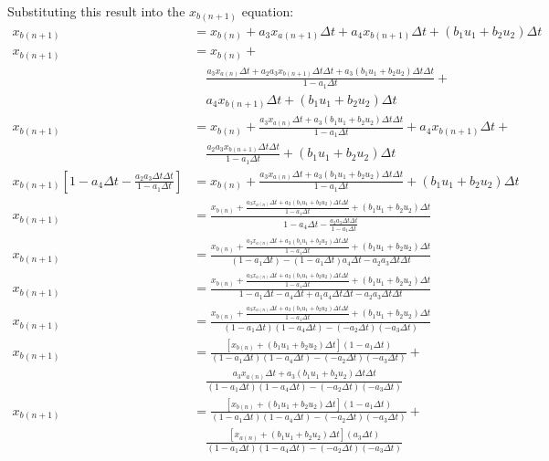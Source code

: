 \documentclass[11pt]{article}
\begin{document}
Substituting this result into the $x_{b(n+1)}$ equation:
\begin{subequations}
  \begin{align}
    x_{b(n+1)} &= x_{b(n)} +  a_3 x_{a(n+1)}\Delta t + a_4 x_{b(n+1)}\Delta t + (b_1 u_1 + b_2 u_2)\Delta t \\
    x_{b(n+1)} &= x_{b(n)} + \\ \nonumber
    &\quad \frac{a_3 x_{a(n)}\Delta t + a_2 a_3 x_{b(n+1)}\Delta t\Delta t + a_3(b_1 u_1 + b_2 u_2)\Delta t\Delta t}{1 - a_1\Delta t} + \\ \nonumber
    &\quad a_4 x_{b(n+1)}\Delta t + (b_1 u_1 + b_2 u_2)\Delta t \\
    x_{b(n+1)} &= x_{b(n)} + \frac{a_3 x_{a(n)}\Delta t + a_3(b_1 u_1 + b_2 u_2)\Delta t\Delta t}{1 - a_1\Delta t} + a_4 x_{b(n+1)}\Delta t + \\ \nonumber
    &\quad \frac{a_2 a_3 x_{b(n+1)}\Delta t\Delta t}{1 - a_1\Delta t} + (b_1 u_1 + b_2 u_2)\Delta t \\
    x_{b(n+1)}\left[1 - a_4\Delta t - \frac{a_2 a_3 \Delta t\Delta t}{1 - a_1\Delta t}\right] &= x_{b(n)} + \frac{a_3 x_{a(n)}\Delta t + a_3(b_1 u_1 + b_2 u_2)\Delta t\Delta t}{1 - a_1\Delta t} + (b_1 u_1 + b_2 u_2)\Delta t \\
    x_{b(n+1)} &= \frac{x_{b(n)} + \frac{a_3 x_{a(n)}\Delta t + a_3(b_1 u_1 + b_2 u_2)\Delta t\Delta t}{1 - a_1\Delta t} + (b_1 u_1 + b_2 u_2)\Delta t}{1 - a_4\Delta t - \frac{a_2 a_3 \Delta t\Delta t}{1 - a_1\Delta t}} \\
    x_{b(n+1)} &= \frac{x_{b(n)} + \frac{a_3 x_{a(n)}\Delta t + a_3(b_1 u_1 + b_2 u_2)\Delta t\Delta t}{1 - a_1\Delta t} + (b_1 u_1 + b_2 u_2)\Delta t}{(1 - a_1\Delta t) - (1 - a_1\Delta t)a_4\Delta t - a_2 a_3 \Delta t\Delta t} \\
    x_{b(n+1)} &= \frac{x_{b(n)} + \frac{a_3 x_{a(n)}\Delta t + a_3(b_1 u_1 + b_2 u_2)\Delta t\Delta t}{1 - a_1\Delta t} + (b_1 u_1 + b_2 u_2)\Delta t}{1 - a_1\Delta t - a_4\Delta t + a_1a_4\Delta t\Delta t - a_2 a_3 \Delta t\Delta t} \\
    x_{b(n+1)} &= \frac{x_{b(n)} + \frac{a_3 x_{a(n)}\Delta t + a_3(b_1 u_1 + b_2 u_2)\Delta t\Delta t}{1 - a_1\Delta t} + (b_1 u_1 + b_2 u_2)\Delta t}{(1 - a_1\Delta t)(1 - a_4\Delta t) - (- a_2\Delta t)(- a_3\Delta t)} \\
    x_{b(n+1)} &= \frac{\left[x_{b(n)} + (b_1 u_1 + b_2 u_2)\Delta t\right](1 - a_1\Delta t)}{(1 - a_1\Delta t)(1 - a_4\Delta t) - (- a_2\Delta t)(- a_3\Delta t)} + \\ \nonumber
    &\quad \frac{a_3 x_{a(n)}\Delta t + a_3(b_1 u_1 + b_2 u_2)\Delta t\Delta t }{(1 - a_1\Delta t)(1 - a_4\Delta t) - (- a_2\Delta t)(- a_3\Delta t)} \\
    x_{b(n+1)} &= \frac{\left[x_{b(n)} + (b_1 u_1 + b_2 u_2)\Delta t\right](1 - a_1\Delta t)}{(1 - a_1\Delta t)(1 - a_4\Delta t) - (- a_2\Delta t)(- a_3\Delta t)} + \\ \nonumber
    &\quad \frac{\left[x_{a(n)} + (b_1 u_1 + b_2 u_2)\Delta t\right](a_3\Delta t)}{(1 - a_1\Delta t)(1 - a_4\Delta t) - (- a_2\Delta t)(- a_3\Delta t)}
  \end{align}
\end{subequations}
\end{document}
